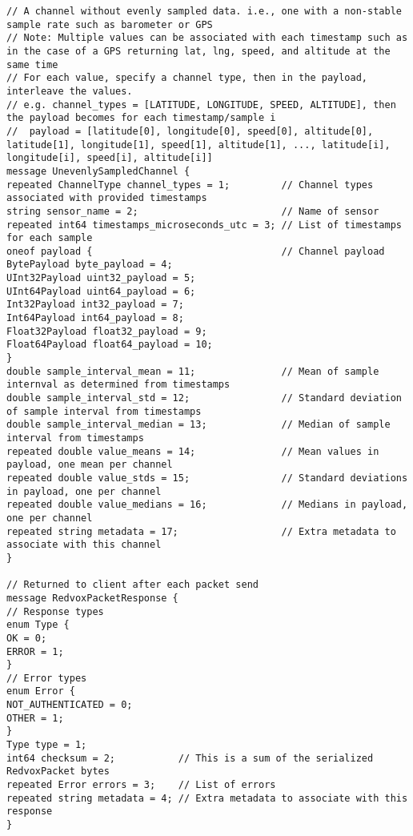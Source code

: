 \begin{verbatim}
// A channel without evenly sampled data. i.e., one with a non-stable sample rate such as barometer or GPS
// Note: Multiple values can be associated with each timestamp such as in the case of a GPS returning lat, lng, speed, and altitude at the same time
// For each value, specify a channel type, then in the payload, interleave the values.
// e.g. channel_types = [LATITUDE, LONGITUDE, SPEED, ALTITUDE], then the payload becomes for each timestamp/sample i
//  payload = [latitude[0], longitude[0], speed[0], altitude[0], latitude[1], longitude[1], speed[1], altitude[1], ..., latitude[i], longitude[i], speed[i], altitude[i]]
message UnevenlySampledChannel {
repeated ChannelType channel_types = 1;         // Channel types associated with provided timestamps
string sensor_name = 2;                         // Name of sensor
repeated int64 timestamps_microseconds_utc = 3; // List of timestamps for each sample
oneof payload {                                 // Channel payload
BytePayload byte_payload = 4;
UInt32Payload uint32_payload = 5;
UInt64Payload uint64_payload = 6;
Int32Payload int32_payload = 7;
Int64Payload int64_payload = 8;
Float32Payload float32_payload = 9;
Float64Payload float64_payload = 10;
}
double sample_interval_mean = 11;               // Mean of sample internval as determined from timestamps
double sample_interval_std = 12;                // Standard deviation of sample interval from timestamps
double sample_interval_median = 13;             // Median of sample interval from timestamps
repeated double value_means = 14;               // Mean values in payload, one mean per channel
repeated double value_stds = 15;                // Standard deviations in payload, one per channel
repeated double value_medians = 16;             // Medians in payload, one per channel
repeated string metadata = 17;                  // Extra metadata to associate with this channel
}

// Returned to client after each packet send
message RedvoxPacketResponse {
// Response types
enum Type {
OK = 0;
ERROR = 1;
}
// Error types
enum Error {
NOT_AUTHENTICATED = 0;
OTHER = 1;
}
Type type = 1;
int64 checksum = 2;           // This is a sum of the serialized RedvoxPacket bytes
repeated Error errors = 3;    // List of errors
repeated string metadata = 4; // Extra metadata to associate with this response
}

\end{verbatim}

